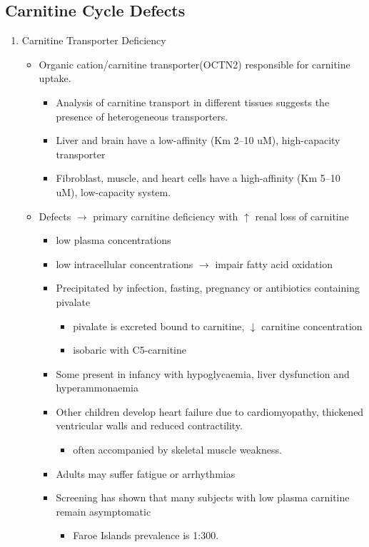 \documentclass{scrartcl}
\begin{document}
\subsection{Carnitine Cycle Defects}
\label{sec:org2de133c}
\begin{enumerate}
\item Carnitine Transporter Deficiency
\label{sec:org4366cef}
\begin{itemize}
\item Organic cation/carnitine transporter(OCTN2) responsible for
carnitine uptake. 
\begin{itemize}
\item Analysis of carnitine transport in different tissues suggests the
presence of heterogeneous transporters.
\item Liver and brain have a low-affinity (Km 2–10 uM), high-capacity transporter
\item Fibroblast, muscle, and heart cells have a high-affinity (Km 5–10 uM), low-capacity system.
\end{itemize}
\item Defects \(\to\) primary carnitine deficiency with \(\uparrow\) renal loss of carnitine
\begin{itemize}
\item low plasma concentrations
\item low intracellular concentrations \(\to\) impair fatty acid oxidation
\end{itemize}
\begin{itemize}
\item Precipitated by infection, fasting, pregnancy or antibiotics containing pivalate
\begin{itemize}
\item pivalate is excreted bound to carnitine, \(\downarrow\) carnitine concentration
\item isobaric with C5-carnitine
\end{itemize}
\item Some present in infancy with hypoglycaemia, liver dysfunction and hyperammonaemia
\item Other children develop heart failure due to cardiomyopathy,
thickened ventricular walls and reduced contractility.
\begin{itemize}
\item often accompanied by skeletal muscle weakness.
\end{itemize}
\item Adults may suffer fatigue or arrhythmias
\item Screening has shown that many subjects with low plasma carnitine remain asymptomatic
\begin{itemize}
\item Faroe Islands prevalence is 1:300.
\end{itemize}
\end{itemize}
\end{itemize}


\end{enumerate}
\end{document}
